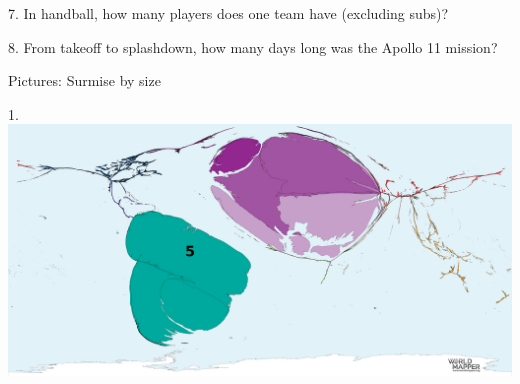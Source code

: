 \begin{frame}
\begin{center}
\Large
7. In handball, how many players does one team have (excluding subs)?
\\
\end{center}
\end{frame}
\begin{frame}
\begin{center}
\Large
8. From takeoff to splashdown, how many days long was the Apollo 11 mission?
\\
\end{center}
\end{frame}
\begin{frame}
\begin{center}
\Huge
Pictures: Surmise by size
\end{center}
\end{frame}
\begin{frame}
\begin{center}
\Large
1. 
\\
\vspace{0.5em}\includegraphics[height=0.6\paperheight]{maps/picture_1.png}
\\
\end{center}
\end{frame}
